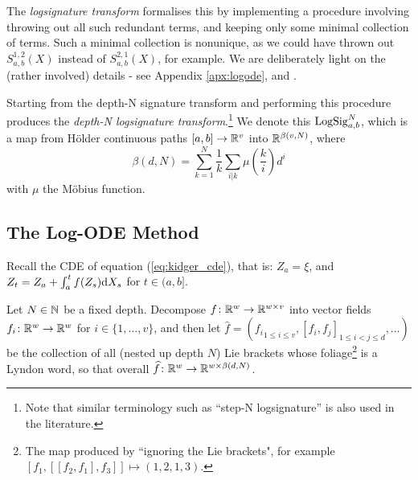 The \emph{logsignature transform} formalises this by implementing a procedure involving throwing out all such redundant terms, and keeping only some minimal collection of terms. Such a minimal collection is nonunique, as we could have thrown out $S^{1, 2}_{a, b}(X)$ instead of $S^{2, 1}_{a, b}(X)$, for example.
We are deliberately light on the (rather involved) details - see Appendix \ref{apx:logode}, and \citet{reizenstein2017logsig, reizenstein2018iisignature}.

Starting from the depth-N signature transform and performing this procedure produces the \emph{depth-N logsignature transform}.\footnote{Note that similar terminology such as ``step-N logsignature'' is also used in the literature.} We denote this $\mathrm{LogSig}^N_{a, b}$, which is a map from H{\"o}lder continuous paths $[a, b] \to \mathbb{R}^v$ into $\mathbb{R}^{\beta(v, N)}$, where
\begin{equation*}
    \beta(d, N) = \sum_{k = 1}^N \frac{1}{k} \sum_{i | k} \mu\left(\frac{k}{i}\right) d^i
\end{equation*}
with $\mu$ the M{\"o}bius function.

\subsection{The Log-ODE Method}
Recall the CDE of equation (\ref{eq:kidger_cde}), that is: $
    Z_a = \xi$, and $Z_t = Z_a + \int^{t}_{a} f(Z_s) \mathrm{d} X_s$ for $t \in (a, b].$

Let $N \in \mathbb{N}$ be a fixed depth. Decompose $f \colon \mathbb{R}^w \to \mathbb{R}^{w \times v}$ into vector fields $f_i \colon \mathbb{R}^w \to \mathbb{R}^w$ for $i \in \{1, \ldots, v\}$, and then let $\widehat{f} = ({f_i}_{1 \leq i \leq v}, {[f_i, f_j]}_{1 \leq i < j \leq d}, \ldots)$ be the collection of all (nested up depth $N$) Lie brackets whose foliage\footnote{The map produced by ``ignoring the Lie brackets", for example $[f_1, [[f_2, f_1], f_3]] \mapsto (1,2,1,3)$.} is a Lyndon word, so that overall $\widehat{f} \colon \mathbb{R}^w \to \mathbb{R}^{w \times \beta(d, N)}$.

